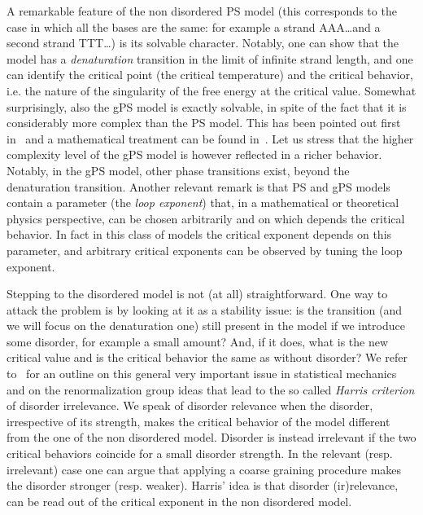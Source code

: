 \documentclass[11pt]{article}
\theoremstyle{definition}
\numberwithin{equation}{section}
\numberwithin{figure}{section}
\numberwithin{table}{section}
\begin{document}
A remarkable feature of the non disordered PS model (this corresponds to the case in which all the bases are the same: for example a strand AAA\dots and a second strand TTT\dots) is its solvable character. Notably, one can show that the model has a \emph{denaturation} transition in the limit of infinite strand length, and one can identify the critical point (the critical temperature) and the critical behavior, i.e. the nature of the singularity of the free energy at the critical value. Somewhat surprisingly, also the gPS model is exactly solvable, in spite of the fact that it is considerably more complex than the PS model. This has been pointed out first in~\cite{cf:GOO,cf:GO04,cf:NG06} and a mathematical treatment can be found in~\cite{cf:GK}. Let us stress that the higher complexity level of the gPS model is however reflected in a richer behavior. Notably, in the gPS model, other phase transitions exist, beyond the denaturation transition. Another relevant remark is that PS and gPS models contain a parameter (the \emph{loop exponent}) that, in a mathematical or theoretical physics perspective, can be chosen arbitrarily and on which depends the critical behavior. In fact in this class of models the critical exponent depends on this parameter, and arbitrary critical exponents can be observed by tuning the loop exponent.


Stepping to the disordered model is not (at all) straightforward. One way to attack the problem is by looking at it as a stability issue: is the transition (and we will focus on the denaturation one) still present in the model if we introduce some disorder, for example a small amount? And, if it does, what is the new critical value and is the critical behavior the same as without disorder? We refer to~\cite[Chapter~5]{cf:GB} for an outline on this general very important issue in statistical mechanics and on the renormalization group ideas that lead to the so called \emph{Harris criterion} of disorder irrelevance. We speak of disorder relevance when the disorder, irrespective of its strength, makes the critical behavior of the model different from the one of the non disordered model. Disorder is instead irrelevant if the two critical behaviors coincide for a small disorder strength. In the relevant (resp. irrelevant) case one can argue that applying a coarse graining procedure makes the disorder stronger (resp. weaker). Harris' idea is that disorder (ir)relevance, can be read out of the critical exponent in the non disordered model.
\end{document}
